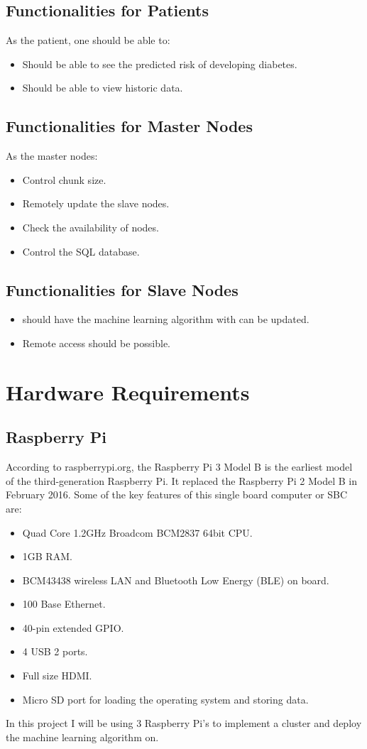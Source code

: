 \documentclass[12pt]{article}
\begin{document}
\subsection{Functionalities for Patients}
As the patient, one should be able to:
\begin{itemize}
\item Should be able to see the predicted risk of developing diabetes.
\item Should be able to view historic data.
\end{itemize}

\subsection{Functionalities for Master Nodes}
As the master nodes:
\begin{itemize}
\item Control chunk size.
\item Remotely update the slave nodes.
\item Check the availability of nodes.
\item Control the SQL database.
\end{itemize}

\subsection{Functionalities for Slave Nodes}
\begin{itemize}
\item should have the machine learning algorithm with can be updated.
\item Remote access should be possible.
\end{itemize}

\newpage
\section{Hardware Requirements}
\subsection{Raspberry Pi}

According to raspberrypi.org, the Raspberry Pi 3 Model B is the earliest model of the third-generation Raspberry Pi. It replaced the Raspberry Pi 2 Model B in February 2016. Some of the key features of this single board computer or SBC are:
\begin{itemize}
\item Quad Core 1.2GHz Broadcom BCM2837 64bit CPU.
\item 1GB RAM.
\item BCM43438 wireless LAN and Bluetooth Low Energy (BLE) on board.
\item 100 Base Ethernet.
\item 40-pin extended GPIO.
\item 4 USB 2 ports.
\item Full size HDMI.
\item Micro SD port for loading the operating system and storing data.
\end{itemize}
In this project I will be using 3 Raspberry Pi's to implement a cluster and deploy the machine learning algorithm on.
\end{document}
